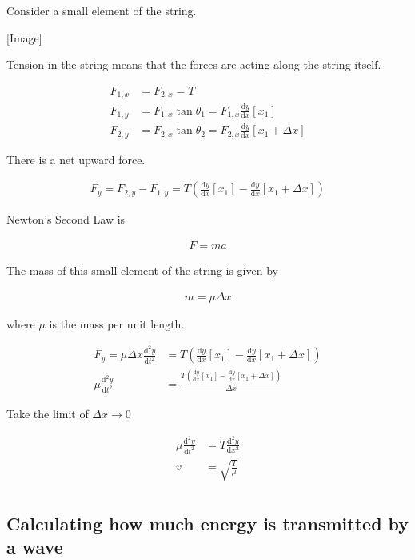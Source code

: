 \documentclass[10pt,a4paper]{article}
\newcommand{\rmd}{\mathrm{d}}
\newcommand{\dif}[2]{\frac{\rmd #1}{\rmd #2}}
\newcommand{\difn}[3]{\frac{\rmd^{#3} #1}{\rmd #2^{#3}}}
\begin{document}
Consider a small element of the string.

[Image]

Tension in the string means that the forces are acting along the string itself.

\begin{align*}
F_{1, x} &= F_{2, x} = T \\
F_{1, y} &= F_{1, x} \tan \theta_{1} = F_{1, x} \dif{y}{x} \left[ x_{1} \right] \\
F_{2, y} &= F_{2, x} \tan \theta_{2} = F_{2, x} \dif{y}{x} \left[ x_{1} + \Delta x \right]
\end{align*}

There is a net upward force.

\begin{align*}
F_{y} = F_{2, y} - F_{1, y} = T \left( \dif{y}{x} \left[ x_{1} \right] - \dif{y}{x} \left[ x_{1} + \Delta x \right] \right)
\end{align*}

Newton's Second Law is

\begin{align*}
F = ma
\end{align*}

The mass of this small element of the string is given by

\begin{align*}
m = \mu \Delta x
\end{align*}

where $\mu$ is the mass per unit length.

\begin{align*}
F_{y} = \mu \Delta x \difn{y}{t}{2} &= T \left( \dif{y}{x} \left[ x_{1} \right] - \dif{y}{x} \left[ x_{1} + \Delta x \right] \right) \\
\mu \difn{y}{t}{2} &= \frac{ T \left( \dif{y}{x} \left[ x_{1} \right] - \dif{y}{x} \left[ x_{1} + \Delta x \right] \right) }{\Delta x} 
\end{align*}

Take the limit of $\Delta x \rightarrow 0$

\begin{align*}
\mu \difn{y}{t}{2} &= T \difn{y}{x}{2} \\
v &= \sqrt{\frac{T}{\mu}} \\
\end{align*}

\subsection*{Calculating how much energy is transmitted by a wave}
\end{document}
